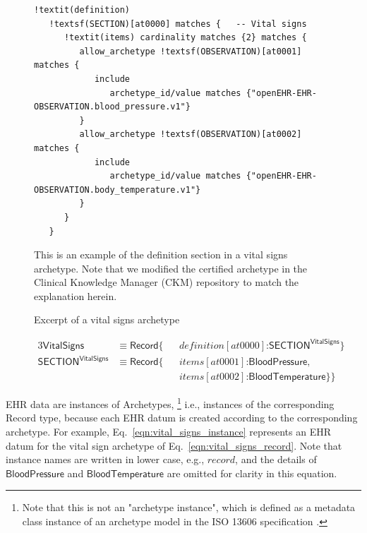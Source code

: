 \documentclass[preprint,3p,onecolumn,times,review]{article}
\begin{document}
{\begin{figure}[!htbp]
\begin{minipage}{1.0\linewidth}
\begin{Verbatim}[frame=single,fontsize=\small, commandchars=!\(\)]
!textit(definition)
   !textsf(SECTION)[at0000] matches {   -- Vital signs
      !textit(items) cardinality matches {2} matches {
         allow_archetype !textsf(OBSERVATION)[at0001] matches {
            include
               archetype_id/value matches {"openEHR-EHR-OBSERVATION.blood_pressure.v1"}
         }
         allow_archetype !textsf(OBSERVATION)[at0002] matches {
            include
               archetype_id/value matches {"openEHR-EHR-OBSERVATION.body_temperature.v1"}
         }
      }
   }
\end{Verbatim}
\end{minipage}
  \caption{Excerpt of a vital signs archetype} \label{fig:vital_signs_archetype}
  {\footnotesize
    This is an example of the definition section in a vital signs archetype.
    Note that we modified the certified archetype in the Clinical Knowledge Manager (CKM) repository to match the explanation herein.
    }
\end{figure}


\begin{figure}[!htbp]
\begin{alignat}{3}
  \mathsf{VitalSigns} & \equiv \mathsf{Record}\{&&definition[at0000] \text{:} \mathsf{SECTION^{VitalSigns}} \} && \label{eqn:vital_signs_record}\\
  \mathsf{SECTION^{VitalSigns}} & \equiv \mathsf{Record}\{&&items[at0001] \text{:} \mathsf{BloodPressure},\nonumber &&\label{eqn:vital_signs_section}\\
                              &                         &&items[at0002] \text{:} \mathsf{BloodTemperature}\}\} &&
\end{alignat}
\end{figure}

EHR data are instances of Archetypes, \footnote{Note that this is not an "archetype instance", which is defined as a metadata class instance of an archetype model in the ISO 13606 specification \cite[p.2]{iso08:13606_healt_elect_part1}.} i.e., instances of the corresponding {\sf Record} type, because each EHR datum is created according to the corresponding archetype.
For example, Eq.~\ref{eqn:vital_signs_instance} represents an EHR datum for the vital sign archetype of Eq.~\ref{eqn:vital_signs_record}.
Note that instance names are written in lower case, e.g., $record$, and the details of $\mathsf{BloodPressure}$ and $\mathsf{BloodTemperature}$ are omitted for clarity in this equation.


}
\end{document}
